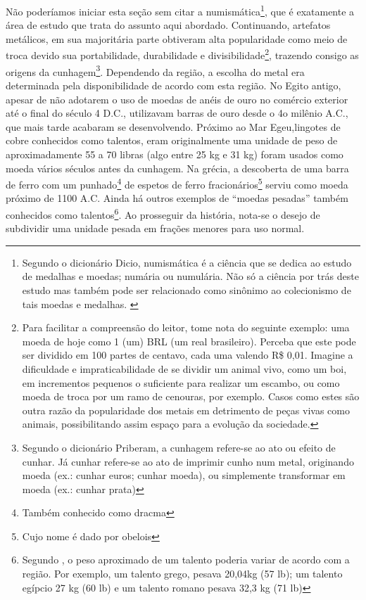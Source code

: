 Não poderíamos iniciar esta seção sem citar a numismática\footnote{Segundo o dicionário Dicio, numismática é a ciência que se dedica ao estudo de medalhas e moedas; numária ou numulária. Não só a ciência por trás deste estudo mas também pode ser relacionado como sinônimo ao colecionismo de tais moedas e medalhas. \cite{DICIONUM}}, que é exatamente a área de estudo que trata do assunto aqui abordado. Continuando,  artefatos metálicos, em sua majoritária parte obtiveram alta popularidade como meio de troca devido sua portabilidade, durabilidade e divisibilidade\footnote{ Para facilitar a compreensão do leitor, tome nota do seguinte exemplo: uma moeda de hoje como 1 (um) BRL (um real brasileiro). Perceba que este pode ser dividido em 100 partes de centavo, cada uma valendo R\$ 0,01. Imagine a dificuldade e impraticabilidade de se dividir um animal vivo, como um boi, em incrementos pequenos o suficiente para realizar um escambo, ou como moeda de troca por um ramo de cenouras, por exemplo. Casos como estes são outra razão da popularidade dos metais em detrimento de peças vivas como animais, possibilitando assim espaço para a evolução da sociedade.}, trazendo consigo as origens da cunhagem\footnote{Segundo o dicionário Priberam, a cunhagem refere-se ao ato ou efeito de cunhar. Já cunhar refere-se ao ato de imprimir cunho num metal, originando moeda (ex.: cunhar euros; cunhar moeda), ou simplemente transformar em moeda (ex.: cunhar prata)\cite{PRIBERAM1}}. Dependendo da região, a escolha do metal era determinada pela disponibilidade de acordo com esta região.
No Egito antigo, apesar de não adotarem o uso de moedas de anéis de ouro no comércio exterior até o final do século 4 D.C., utilizavam barras de ouro desde o 4o milênio A.C., que mais tarde acabaram se desenvolvendo. Próximo ao Mar Egeu, ​​lingotes de cobre conhecidos como talentos, eram originalmente uma unidade de peso de aproximadamente 55 a 70 libras (algo entre 25 kg e 31 kg) foram usados ​​como moeda vários séculos antes da cunhagem. Na grécia, a descoberta de uma barra de ferro com um punhado\footnote{Também conhecido como dracma} de espetos de ferro fracionários\footnote{Cujo nome é dado por obelois} serviu como moeda próximo de 1100 A.C. Ainda há outros exemplos de ``moedas pesadas'' também conhecidos como talentos\footnote{Segundo \cite{HUMPHREY}, o peso aproximado de um talento poderia variar de acordo com a região. Por exemplo, um talento grego, pesava 20,04kg (57 lb); um talento egípcio 27 kg (60 lb) e um talento romano pesava 32,3 kg (71 lb)}. Ao prosseguir da história, nota-se o desejo de subdividir uma unidade pesada em frações menores para uso normal. \\


